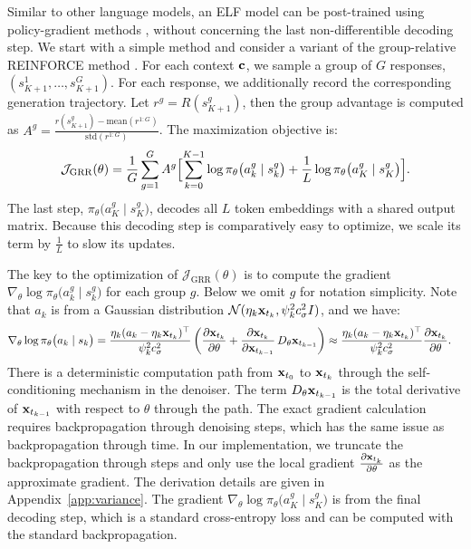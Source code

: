 Similar to other language models, an ELF model can be post-trained using policy-gradient methods \citep{sutton1998reinforcement}, without concerning the last non-differentible decoding step. We start with a simple method and consider a variant of the group-relative REINFORCE method \citep{yao2026grouprelative}. 
For each context ${\mathbf{c}}$, we sample a group of $G$ responses, $(s^1_{K+1}, \ldots, s^G_{K+1})$. For each response, we additionally record the corresponding generation trajectory. Let 
$r^g = R(s^g_{K+1})$, then the group advantage is computed as $A^g =  \frac{r(s^g_{K+1}) - \mathrm{mean}(r^{1:G})}{\mathrm{std}(r^{1:G})}$.
The maximization objective is:
\begin{equation}
\mathcal J_{\mathrm{GRR}}(\theta)=\frac1G\sum_{g=1}^{G}A^g\Bigl[\sum_{k=0}^{K-1}\log\pi_\theta\bigl(a^g_k \mid s^g_{k}\bigr)+\frac{1}{L} \log\pi_\theta\bigl(a^g_{K} \mid s^g_K\bigr)\Bigr].
\label{eq:grpo_loss}
\end{equation}
The last step, $\pi_\theta\bigl(a^g_{K} \mid s^g_K\bigr)$, decodes all $L$ token embeddings with a shared output matrix.
Because this decoding step is comparatively easy to optimize, we scale its term by $\frac{1}{L}$ to slow its updates.

\begingroup\color{blue}
The key to the optimization of $\mathcal J_{\mathrm{GRR}}(\theta)$ is to compute the gradient $\nabla_\theta \log\pi_\theta\bigl(a^g_k \mid s^g_{k}\bigr)$ for each group $g$. Below we omit $g$ for notation simplicity. Note that $a_k$ is from a Gaussian distribution $\mathcal{N}(\eta_k {\mathbf{x}}_{t_{k}}, \psi_k^2 c_\sigma^2 I)$, and we have:
\begin{align*}
\nabla_\theta \log\pi_\theta\bigl(a_k \mid s_{k}\bigr) &= \frac{\eta_k(a_k - \eta_k {\mathbf{x}}_{t_{k}})^\top }{\psi_{k}^2 c_\sigma^2} \left( \frac{\partial {\mathbf{x}}_{t_{k}}}{\partial \theta} +
\frac{\partial {\mathbf{x}}_{t_{k}}}{\partial {\mathbf{x}}_{t_{k-1}}}\,D_{\theta} {\mathbf{x}}_{t_{k-1}} \right) \approx \frac{\eta_k(a_k - \eta_k {\mathbf{x}}_{t_{k}})^\top }{\psi_{k}^2 c_\sigma^2}\frac{\partial {\mathbf{x}}_{t_{k}}}{\partial \theta}.
\end{align*}
There is a deterministic computation path from ${\mathbf{x}}_{t_0}$ to ${\mathbf{x}}_{t_{k}}$ through the self-conditioning mechanism in the denoiser. The term $D_\theta {\mathbf{x}}_{t_{k-1}}$ is the total derivative of ${\mathbf{x}}_{t_{k-1}}$ with respect to $\theta$ through the path. The exact gradient calculation requires backpropagation through denoising steps, which has the same issue as backpropagation through time. In our implementation, we truncate the backpropagation through steps and only use the local gradient $\frac{\partial {\mathbf{x}}_{t_{k}}}{\partial \theta}$ as the approximate gradient. The derivation details are given in Appendix~\ref{app:variance}. The gradient $\nabla_\theta\log\pi_\theta\bigl(a^g_{K} \mid s^g_K\bigr)$ is from the final decoding step, which is a standard cross-entropy loss and can be computed with the standard backpropagation.
\endgroup

